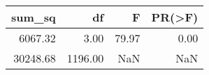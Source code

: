 \begin{tabular}{rrrr}
\toprule
sum\_sq & df & F & PR(>F) \\
\midrule
6067.32 & 3.00 & 79.97 & 0.00 \\
30248.68 & 1196.00 & NaN & NaN \\
\bottomrule
\end{tabular}

